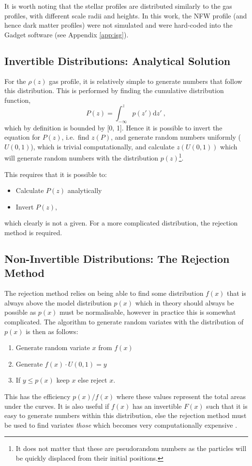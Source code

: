 It is worth noting that the stellar profiles are distributed similarly
to the gas profiles, with different scale radii and heights. In this work, the NFW profile (and hence dark matter profiles) were not simulated and were hard-coded into the Gadget software (see Appendix \ref{app:isg}).

\subsection{Invertible Distributions: Analytical
Solution}\label{easy-distributions---analytical-solution}

For the \(\rho(z)\) gas profile, it is relatively simple to generate
numbers that follow this distribution. This is performed by finding the
cumulative distribution function,
\[
    P(z) = \int_{-\infty}^z p(z') \mathrm{d}z'~,
\]
which by definition is bounded by {[}0, 1{]}. Hence it is possible to invert the
equation for \(P(z)\), i.e.~find \(z(P)\), and generate random numbers
uniformly (\(U(0, 1)\)), which is trivial computationally, and calculate
\(z(U(0, 1))\) which will generate random numbers with the distribution
\(p(z)\)\footnote{It does not matter that these are pseudorandom numbers as the particles will be quickly displaced from their initial positions.}.

This requires that it is possible to:
\begin{itemize}
\item
  Calculate \(P(z)\) analytically
\item
  Invert \(P(z)\),
\end{itemize}
which clearly is not a given. For a more complicated distribution, the
rejection method is required.

\subsection{Non-Invertible Distributions: The Rejection
Method}\label{hard-distributions---the-rejection-method}

The rejection method relies on being able to find some distribution
\(f(x)\) that is always above the model distribution \(p(x)\) which in theory
should always be possible as \(p(x)\) must be normalisable, however
in practice this is somewhat complicated. The algorithm to generate
random variates with the distribution of \(p(x)\) is then as follows:

\begin{enumerate}
\item
  Generate random variate \(x\) from \(f(x)\)
\item
  Generate \(f(x) \cdot U(0, 1) = y\)
\item
  If \(y \leq p(x)\) keep \(x\) else reject \(x\).
\end{enumerate}

This has the efficiency \(p(x)/f(x)\) where these values represent the
total areas under the curves. It is also useful if \(f(x)\) has an
invertible \(F(x)\) such that it is easy to generate numbers within this
distribution, else the rejection method must be used to find variates
\emph{those} which becomes very computationally expensive \citep{press_numerical_2007}.

